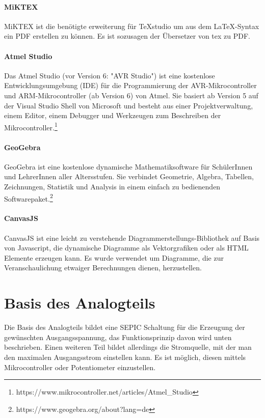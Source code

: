 \documentclass[paper=a4, 12pt]{scrreprt}
\begin{document}
	\paragraph{MiKTEX}\hfill \break
	MiKTEX ist die benötigte erweiterung für TeXstudio um aus dem LaTeX-Syntax ein PDF erstellen zu können. Es ist sozusagen der Übersetzer von tex zu PDF. \newpage
	\paragraph{Atmel Studio}\hfill \break
	Das Atmel Studio (vor Version 6: "AVR Studio") ist eine kostenlose Entwicklungsumgebung (IDE) für die Programmierung der AVR-Mikrocontroller und ARM-Mikrocontroller (ab Version 6) von Atmel. Sie basiert ab Version 5 auf der Visual Studio Shell von Microsoft und besteht aus einer Projektverwaltung, einem Editor, einem Debugger und Werkzeugen zum Beschreiben der Mikrocontroller.\footnote{https://www.mikrocontroller.net/articles/Atmel\_Studio}
	\paragraph{GeoGebra}\hfill \break
	GeoGebra ist eine kostenlose dynamische Mathematiksoftware für SchülerInnen und LehrerInnen aller Altersstufen. Sie verbindet Geometrie, Algebra, Tabellen, Zeichnungen, Statistik und Analysis in einem einfach zu bedienenden Softwarepaket.\footnote{https://www.geogebra.org/about?lang=de}
	\paragraph{CanvasJS}\hfill \break
	CanvasJS ist eine leicht zu verstehende Diagrammerstellungs-Bibliothek auf Basis von Javascript, die dynamische Diagramme als Vektorgrafiken oder als HTML Elemente erzeugen kann. Es wurde verwendet um Diagramme, die zur Veranschaulichung etwaiger Berechnungen dienen, herzustellen.
	\newpage
	
	\section{Basis des Analogteils}\hfill \break
	Die Basis des Analogteils bildet eine SEPIC Schaltung für die Erzeugung der gewünschten Ausgangsspannung, das Funktionsprinzip davon wird unten beschrieben. Einen weiteren Teil bildet allerdings die Stromquelle, mit der man den maximalen Ausgangsstrom einstellen kann. Es ist möglich, diesen mittels Mikrocontroller oder Potentiometer einzustellen.
\end{document}
